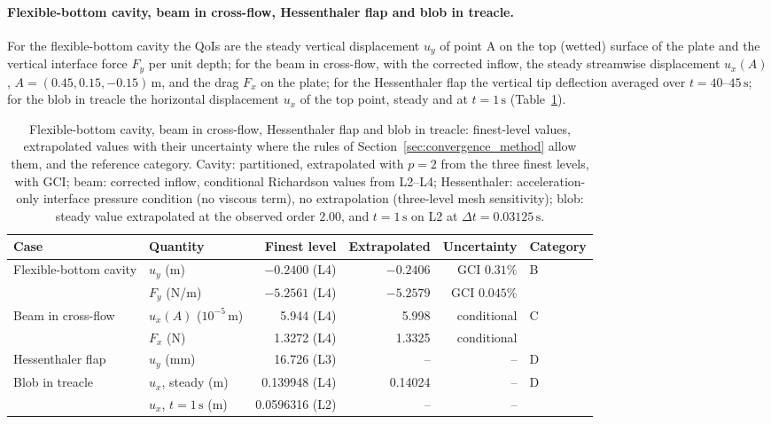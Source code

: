 \paragraph{Flexible-bottom cavity, beam in cross-flow, Hessenthaler flap and blob in treacle.}
For the flexible-bottom cavity the QoIs are the steady vertical displacement $u_y$ of point A on the top (wetted) surface of the plate and the vertical interface force $F_y$ per unit depth; for the beam in cross-flow, with the corrected inflow, the steady streamwise displacement $u_x(A)$, $A = (0.45, 0.15, -0.15)\,\mathrm{m}$, and the drag $F_x$ on the plate; for the Hessenthaler flap the vertical tip deflection averaged over $t = 40$--$45\,\mathrm{s}$; for the blob in treacle the horizontal displacement $u_x$ of the top point, steady and at $t = 1\,\mathrm{s}$ (Table~\ref{tab:refvals_other}).

\begin{table}[htbp]
	\centering
	\footnotesize
	\setlength{\tabcolsep}{4pt}
	\caption{Flexible-bottom cavity, beam in cross-flow, Hessenthaler flap and blob in treacle: finest-level values, extrapolated values with their uncertainty where the rules of Section~\ref{sec:convergence_method} allow them, and the reference category. Cavity: partitioned, extrapolated with $p = 2$ from the three finest levels, with GCI; beam: corrected inflow, conditional Richardson values from L2--L4; Hessenthaler: acceleration-only interface pressure condition (no viscous term), no extrapolation (three-level mesh sensitivity); blob: steady value extrapolated at the observed order $2.00$, and $t = 1\,\mathrm{s}$ on L2 at $\Delta t = 0.03125\,\mathrm{s}$.}
	\label{tab:refvals_other}
	\begin{tabular}{llrrrl}
		\toprule
		Case & Quantity & Finest level & Extrapolated & Uncertainty & Category \\
		\midrule
		Flexible-bottom cavity & $u_y$ (m) & $-0.2400$ (L4) & $-0.2406$ & GCI $0.31\%$ & B \\
		 & $F_y$ (N/m) & $-5.2561$ (L4) & $-5.2579$ & GCI $0.045\%$ & \\
		Beam in cross-flow & $u_x(A)$ ($10^{-5}\,\mathrm{m}$) & 5.944 (L4) & 5.998 & conditional & C \\
		 & $F_x$ (N) & 1.3272 (L4) & 1.3325 & conditional & \\
		Hessenthaler flap & $u_y$ (mm) & 16.726 (L3) & -- & -- & D \\
		Blob in treacle & $u_x$, steady (m) & 0.139948 (L4) & 0.14024 & -- & D \\
		 & $u_x$, $t = 1\,\mathrm{s}$ (m) & 0.0596316 (L2) & -- & -- & \\
		\bottomrule
	\end{tabular}
\end{table}

